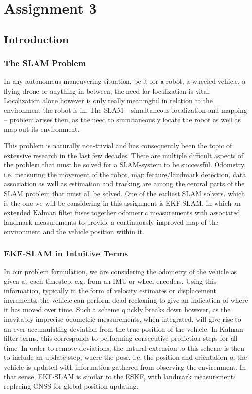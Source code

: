 \section{Assignment 3}
\subsection{Introduction}
\subsubsection{The SLAM Problem}
In any autonomous maneuvering situation, be it for a robot, a wheeled vehicle, a flying drone or anything in between, the need for localization is vital.
Localization alone however is only really meaningful in relation to the environment the robot is in.
The SLAM – simultaneous localization and mapping – problem arises then, as the need to simultaneously locate the robot as well as map out its environment. 

This problem is naturally non-trivial and has consequently been the topic of extensive research in the last few decades.
There are multiple difficult aspects of the problem that must be solved for a SLAM-system to be successful.
Odometry, i.e. measuring the movement of the robot, map feature/landmark detection, data association as well as estimation and tracking are among the central parts of the SLAM problem that must all be solved.
One of the earliest SLAM solvers, which is the one we will be considering in this assignment is EKF-SLAM, in which an extended Kalman filter fuses together odometric measurements with associated landmark measurements to provide a continuously improved map of the environment and the vehicle position within it.

\subsubsection{EKF-SLAM in Intuitive Terms}
In our problem formulation, we are considering the odometry of the vehicle as given at each timestep, e.g. from an IMU or wheel encoders.
Using this information, typically in the form of velocity estimates or displacement increments, the vehicle can perform dead reckoning to give an indication of where it has moved over time.
Such a scheme quickly breaks down however, as the inevitably imprecise odometric measurements, when integrated, will give rise to an ever accumulating deviation from the true position of the vehicle. In Kalman filter terms, this corresponds to performing consecutive prediction steps for all time. In order to remove deviations, the natural extension to this scheme is then to include an update step, where the pose, i.e. the position and orientation of the vehicle is updated with information gathered from observing the environment. In that sense, EKF-SLAM is similar to the ESKF, with landmark measurements replacing GNSS for global position updating.

